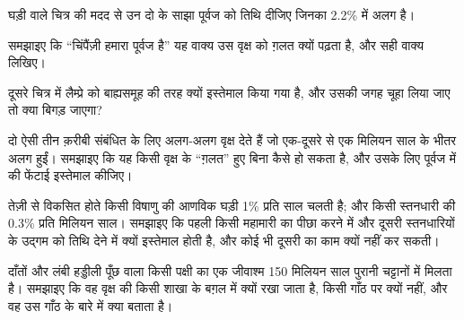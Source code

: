 \begin{exercise}[$\star\star$]\label{exo:g12:phylogenetic-trees:9}
घड़ी वाले चित्र की मदद से उन दो  के साझा पूर्वज को तिथि दीजिए जिनका
 2.2\% में अलग है।
\end{exercise}

\begin{exercise}[$\star\star$]\label{exo:g12:phylogenetic-trees:10}
समझाइए कि ``चिंपैंज़ी हमारा पूर्वज है'' यह वाक्य उस वृक्ष को ग़लत क्यों
पढ़ता है, और सही वाक्य लिखिए।
\end{exercise}

\begin{exercise}[$\star\star$]\label{exo:g12:phylogenetic-trees:11}
दूसरे चित्र में लैम्प्रे को बाह्यसमूह की तरह क्यों इस्तेमाल किया गया है, और
उसकी जगह चूहा लिया जाए तो क्या बिगड़ जाएगा?
\end{exercise}

\begin{exercise}[$\star\star\star$]\label{exo:g12:phylogenetic-trees:12}
दो  ऐसी तीन क़रीबी संबंधित  के लिए अलग-अलग वृक्ष देते हैं जो
एक-दूसरे से एक मिलियन साल के भीतर अलग हुईं। समझाइए कि यह किसी वृक्ष के
``ग़लत'' हुए बिना कैसे हो सकता है, और उसके लिए पूर्वज  में
 की फेंटाई इस्तेमाल कीजिए।
\end{exercise}

\begin{exercise}[$\star\star\star$]\label{exo:g12:phylogenetic-trees:13}
तेज़ी से विकसित होते किसी विषाणु की आणविक घड़ी 1\% प्रति साल चलती है; और
किसी स्तनधारी  की 0.3\% प्रति मिलियन साल। समझाइए कि पहली किसी महामारी का
पीछा करने में और दूसरी स्तनधारियों के उद्गम को तिथि देने में क्यों
इस्तेमाल होती है, और कोई भी दूसरी का काम क्यों नहीं कर सकती।
\end{exercise}

\begin{exercise}[$\star\star\star$]\label{exo:g12:phylogenetic-trees:14}
दाँतों और लंबी हड्डीली पूँछ वाला किसी पक्षी का एक जीवाश्म 150 मिलियन साल
पुरानी चट्टानों में मिलता है। समझाइए कि वह वृक्ष की किसी शाखा के बग़ल में
क्यों रखा जाता है, किसी गाँठ पर क्यों नहीं, और वह उस गाँठ के बारे में क्या
बताता है।
\end{exercise}

